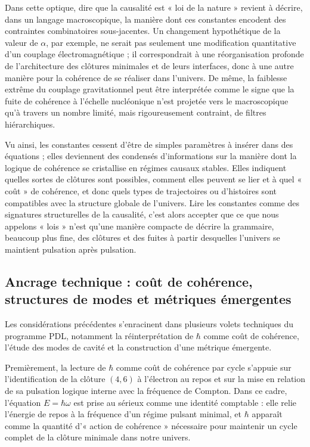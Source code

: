 \documentclass[11pt,a4paper]{article}
\theoremstyle{definition}
\begin{document}
Dans cette optique, dire que la causalité est « loi de la nature » revient à décrire, dans un langage macroscopique, la manière dont ces constantes encodent des contraintes combinatoires sous-jacentes. Un changement hypothétique de la valeur de \(\alpha\), par exemple, ne serait pas seulement une modification quantitative d’un couplage électromagnétique ; il correspondrait à une réorganisation profonde de l’architecture des clôtures minimales et de leurs interfaces, donc à une autre manière pour la cohérence de se réaliser dans l’univers.\cite{Laubscher_Alpha_v2_2024,Laubscher_PDL_GlobalMapping_v6_2024} De même, la faiblesse extrême du couplage gravitationnel peut être interprétée comme le signe que la fuite de cohérence à l’échelle nucléonique n’est projetée vers le macroscopique qu’à travers un nombre limité, mais rigoureusement contraint, de filtres hiérarchiques.\cite{Laubscher_UniversalCoherenceLeakage_2024,Laubscher_Exponent18_v2_2024}

Vu ainsi, les constantes cessent d’être de simples paramètres à insérer dans des équations ; elles deviennent des condensés d’informations sur la manière dont la logique de cohérence se cristallise en régimes causaux stables. Elles indiquent quelles sortes de clôtures sont possibles, comment elles peuvent se lier et à quel « coût » de cohérence, et donc quels types de trajectoires ou d’histoires sont compatibles avec la structure globale de l’univers.\cite{Laubscher_EffectiveFields_2024,Laubscher_Existence_PulsatingClosure_2026} Lire les constantes comme des signatures structurelles de la causalité, c’est alors accepter que ce que nous appelons « lois » n’est qu’une manière compacte de décrire la grammaire, beaucoup plus fine, des clôtures et des fuites à partir desquelles l’univers se maintient pulsation après pulsation.

\subsection{Ancrage technique : coût de cohérence, structures de modes et métriques émergentes}

Les considérations précédentes s’enracinent dans plusieurs volets techniques du programme PDL, notamment la réinterprétation de \(\hbar\) comme coût de cohérence, l’étude des modes de cavité et la construction d’une métrique émergente.\cite{Laubscher_EmergencePhysicalReality_2024,Laubscher_CavityModes_PDL_2024,Laubscher_EffectiveFields_2024}

Premièrement, la lecture de \(\hbar\) comme coût de cohérence par cycle s’appuie sur l’identification de la clôture \((4,6)\) à l’électron au repos et sur la mise en relation de sa pulsation logique interne avec la fréquence de Compton.\cite{Laubscher_EmergencePhysicalReality_2024,Laubscher_Schrodinger_Compat_v2_2024} Dans ce cadre, l’équation \(E = \hbar \omega\) est prise au sérieux comme une identité comptable : elle relie l’énergie de repos à la fréquence d’un régime pulsant minimal, et \(\hbar\) apparaît comme la quantité d’« action de cohérence » nécessaire pour maintenir un cycle complet de la clôture minimale dans notre univers.
\end{document}
